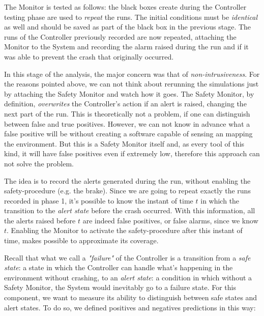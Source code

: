 The Monitor is tested as follows: the black boxes create during the Controller testing phase are used to \textsl{repeat} the runs. The initial conditions must be \textsl{identical} as well and should be saved as part of the black box in the previous stage. The runs of the Controller previously recorded are now repeated, attaching the Monitor to the System and recording the alarm raised during the run and if it was able to prevent the crash that originally occurred.

In this stage of the analysis, the major concern was that of \textsl{non-intrusiveness}. For the reasons pointed above, we can not think about rerunning the simulations just by attaching the Safety Monitor and watch how it goes. The Safety Monitor, by definition, \textsl{overwrites} the Controller's action if an alert is raised, changing the next part of the run. This is theoretically not a problem, if one can distinguish between false and true positives. However, we can not know in advance what a false positive will be without creating a software capable of sensing an mapping the environment. But this is a Safety Monitor itself and, as every tool of this kind, it will have false positives even if extremely low, therefore this approach can not solve the problem.

The idea is to record the alerts generated during the run, without enabling the safety-procedure (e.g. the brake). Since we are going to repeat exactly the runs recorded in phase 1, it's possible to know the instant of time $t$ in which the transition to the \textsl{alert state} before the crash occurred. With this information, all the alerts raised before $t$ are indeed false positives, or false alarms, since we know $t$. Enabling the Monitor to activate the safety-procedure after this instant of time, makes possible to approximate its coverage. 

Recall that what we call a \textsl{"failure"} of the Controller is a transition from a \textsl{safe state}: a state in which the Controller can handle what's happening in the environment without crashing, to an \textsl{alert state}: a condition in which without a Safety Monitor, the System would inevitably go to a failure state.
For this component, we want to measure its ability to distinguish between safe states and alert states. To do so, we defined positives and negatives predictions in this way:\newpage

